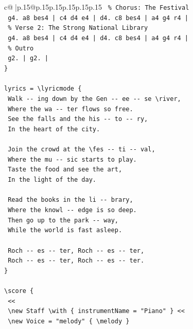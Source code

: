 \documentclass{article}
\begin{document}
{\begin{supertabular}{c@{$\;$}|p{.15\linewidth}@{}p{.15\linewidth}p{.15\linewidth}p{.15\linewidth}p{.15\linewidth}p{.15\linewidth}}
{{{\texttt{  \% Chorus: The Festival} \\
\texttt{  g4. a8 bes4 | c4 d4 e4 | d4. c8 bes4 | a4 g4 r4 |} \\
\texttt{  \% Verse 2: The Strong National Library} \\
\texttt{  g4. a8 bes4 | c4 d4 e4 | d4. c8 bes4 | a4 g4 r4 |} \\
\texttt{  \% Outro} \\
\texttt{  g2. | g2. |} \\
\texttt{\}} \\
\\ 
\texttt{lyrics = \textbackslash{}lyricmode \{} \\
\texttt{  Walk {-}{-} ing down by the Gen {-}{-} ee {-}{-} se \textbackslash{}river,} \\
\texttt{  Where the wa {-}{-} ter flows so free.} \\
\texttt{  See the falls and the his {-}{-} to {-}{-} ry,} \\
\texttt{  In the heart of the city.} \\
\\ 
\texttt{  Join the crowd at the \textbackslash{}fes {-}{-} ti {-}{-} val,} \\
\texttt{  Where the mu {-}{-} sic starts to play.} \\
\texttt{  Taste the food and see the art,} \\
\texttt{  In the light of the day.} \\
\\ 
\texttt{  Read the books in the li {-}{-} brary,} \\
\texttt{  Where the knowl {-}{-} edge is so deep.} \\
\texttt{  Then go up to the park {-}{-} way,} \\
\texttt{  While the world is fast asleep.} \\
\\ 
\texttt{  Roch {-}{-} es {-}{-} ter, Roch {-}{-} es {-}{-} ter,} \\
\texttt{  Roch {-}{-} es {-}{-} ter, Roch {-}{-} es {-}{-} ter.} \\
\texttt{\}} \\
\\ 
\texttt{\textbackslash{}score \{} \\
\texttt{  <<} \\
\texttt{    \textbackslash{}new Staff \textbackslash{}with \{ instrumentName = "Piano" \} <<} \\
\texttt{      \textbackslash{}new Voice = "melody" \{ \textbackslash{}melody \}} \\
}}}
\end{supertabular}}
\end{document}
